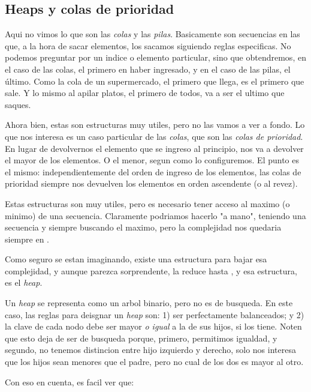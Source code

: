 \documentclass{article}
\begin{document}
\subsection{Heaps y colas de prioridad}

Aqui no vimos lo que son las \textit{colas} y las \textit{pilas}. Basicamente son secuencias en las que, a la hora de sacar elementos, los sacamos siguiendo reglas especificas. No podemos preguntar por un indice o elemento particular, sino que obtendremos, en el caso de las colas, el primero en haber ingresado, y en el caso de las pilas, el último. Como la cola de un supermercado, el primero que llega, es el primero que sale. Y lo mismo al apilar platos, el primero de todos, va a ser el ultimo que saques.

Ahora bien, estas son estructuras muy utiles, pero no las vamos a ver a fondo. Lo que nos interesa es un caso particular de las \textit{colas}, que son las \textit{colas de prioridad}. En lugar de devolvernos el elemento que se ingreso al principio, nos va a devolver el mayor de los elementos. O el menor, segun como lo configuremos. El punto es el mismo: independientemente del orden de ingreso de los elementos, las colas de prioridad siempre nos devuelven los elementos en orden ascendente (o al revez).

Estas estructuras son muy utiles, pero es necesario tener acceso al maximo (o minimo) de una secuencia. Claramente podriamos hacerlo "a mano", teniendo una secuencia y siempre buscando el maximo, pero la complejidad nos quedaria siempre en .

Como seguro se estan imaginando, existe una estructura para bajar esa complejidad, y aunque parezca sorprendente, la reduce hasta , y esa estructura, es el \textit{heap}.

Un \textit{heap} se representa como un arbol binario, pero no es de busqueda. En este caso, las reglas para deisgnar un \textit{heap} son: 1) ser perfectamente balanceados; y 2) la clave de cada nodo debe ser mayor \textit{o igual} a la de sus hijos, si los tiene. Noten que esto deja de ser de busqueda porque, primero, permitimos igualdad, y segundo, no tenemos distincion entre hijo izquierdo y derecho, solo nos interesa que los hijos sean menores que el padre, pero no cual de los dos es mayor al otro.

Con eso en cuenta, es facil ver que:

\begin{multicols}{3}


\end{multicols}
\end{document}
